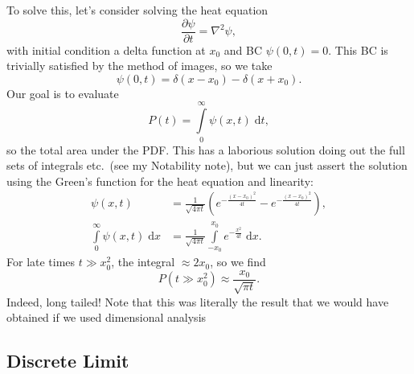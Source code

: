 \documentclass[12pt]{report}
\newcommand*{\pd}[2]{\frac{\partial#1}{\partial#2}}
\newcommand*{\p}[1]{\left(#1\right)}
\begin{document}
To solve this, let's consider solving the heat equation
\begin{equation}
    \pd{\psi}{t} = \nabla^2 \psi,
\end{equation}
with initial condition a delta function at $x_0$ and BC $\psi(0, t) = 0$. This
BC is trivially satisfied by the method of images, so we take
\begin{equation}
    \psi(0, t) = \delta\p{x - x_0} - \delta\p{x + x_0}.
\end{equation}
Our goal is to evaluate
\begin{equation}
    P(t) = \int\limits_0^\infty \psi(x, t)\;\mathrm{d}t,
\end{equation}
so the total area under the PDF\@. This has a laborious solution doing out the
full sets of integrals etc.\ (see my Notability note), but we can just assert
the solution using the Green's function for the heat equation and linearity:
\begin{align}
    \psi(x, t) &= \frac{1}{\sqrt{4\pi t}}
        \p{e^{-\frac{(x - x_0)^2}{4t}} - e^{-\frac{(x - x_0)^2}{4t}}},\\
    \int\limits_0^\infty \psi(x, t)\;\mathrm{d}x
        &= \frac{1}{\sqrt{4\pi t}}\int\limits_{-x_0}^{x_0}
            e^{-\frac{x^2}{4t}}\;\mathrm{d}x.
\end{align}
For late times $t \gg x_0^2$, the integral $\approx 2x_0$, so we find
\begin{equation}
    P(t \gg x_0^2) \approx \frac{x_0}{\sqrt{\pi t}}.
\end{equation}
Indeed, long tailed! Note that this was literally the result that we would have
obtained if we used dimensional analysis

\subsection{Discrete Limit}
\end{document}
